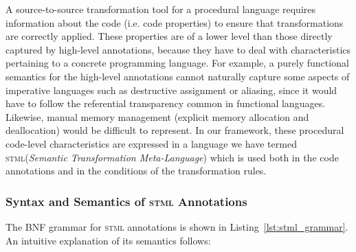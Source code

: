 \documentclass[svgnames,usenames,preprint,nocopyrightspace]{sigplanconf}
\newcommand{\stml}{\textsc{stml}\xspace}
\begin{document}
A source-to-source transformation tool for a procedural language
requires information about the code (i.e. code properties) to ensure
that transformations are correctly applied.  These properties are of a
lower level than those directly captured by high-level annotations,
because they have to deal with characteristics pertaining to a
concrete programming language.
For example, a purely functional semantics for the high-level annotations
cannot naturally capture some aspects of imperative languages such as
destructive assignment or aliasing, since it would have to follow the
referential transparency common in functional languages.
Likewise, manual memory management (explicit memory allocation and
deallocation) would be difficult to represent.
In our framework, these procedural code-level characteristics are
expressed in a language we have termed \stml (\emph{Semantic
  Transformation Meta-Language}) which is used both in the code
annotations and in the conditions of the transformation rules.










\subsubsection{Syntax and Semantics of \stml Annotations}
\label{sec:stml-annotations}



The BNF grammar for \stml annotations is shown in 
Listing~\ref{lst:stml_grammar}.  An intuitive explanation of its
semantics follows:
\end{document}

